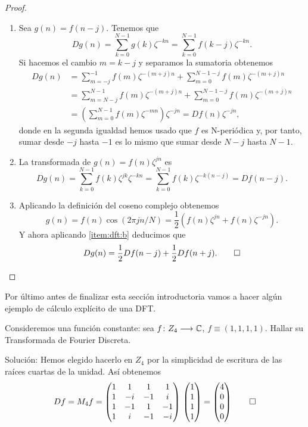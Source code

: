 \documentclass{article}
\begin{document}
\begin{proof}~
\begin{enumerate}
    \item Sea $g(n)=f(n-j)$. Tenemos que
    \[
    Dg(n)=\sum_{k=0}^{N-1}g(k)\zeta^{-kn}=\sum_{k=0}^{N-1}f(k-j)\zeta^{-kn}.
    \]
    Si hacemos el cambio $m=k-j$ y separamos la sumatoria obtenemos
    \begin{align*}
    Dg(n) & =\sum_{m=-j}^{-1}f(m)\zeta^{-(m+j)n}+\sum_{m=0}^{N-1-j}f(m)\zeta^{-(m+j)n} \\
    & =\sum_{m=N-j}^{N-1}f(m)\zeta^{-(m+j)n}+\sum_{m=0}^{N-1-j}f(m)\zeta^{-(m+j)n} \\
    & =\left(\sum_{m=0}^{N-1}f(m)\zeta^{-mn}\right)\zeta^{-jn} =Df(n)\zeta^{-jn},
    \end{align*}
    donde en la segunda igualdad hemos usado que $f$ es N-periódica y, por tanto, sumar desde $-j$ hasta $-1$ es lo mismo que sumar desde $N-j$ hasta $N-1$.
    \item La transformada de $g(n) = f(n)\zeta^{jn}$ es 
    \[
    Dg(n) = \sum_{k=0}^{N-1}f(k)\zeta^{jk}\zeta^{-kn}=\sum_{k=0}^{N-1}f(k)\zeta^{-k(n-j)}=Df(n-j).
    \]
    \item Aplicando la definición del coseno complejo obtenemos
    \[
    g(n) = f(n)\cos(2\pi jn/N)=\frac{1}{2}\left(f(n)\zeta^{jn}+f(n)\zeta^{-jn}\right).
    \]
    Y ahora aplicando \ref{item:dft:b} deducimos que 
    \[
    Dg(n) = \frac{1}{2}Df(n-j)+\frac{1}{2}Df(n+j). \qedhere
    \]
\end{enumerate}
\end{proof}

Por último antes de finalizar esta sección introductoria vamos a hacer algún ejemplo de cálculo explícito de una DFT.

\begin{ex}
Consideremos una función constante: sea $f\colon Z_4 \longrightarrow \mathbb{C}$, $f\equiv(1,1,1,1)$. Hallar su Transformada de Fourier Discreta.

Solución:
Hemos elegido hacerlo en $Z_4$ por la simplicidad de escritura de las raíces cuartas de la unidad. Así obtenemos
\[
Df=M_{4}f=\begin{pmatrix}
1&1&1&1 \\
1&-i&-1&i\\
1&-1&1&-1\\
1&i&-1&-i\\
\end{pmatrix}
\,
\begin{pmatrix}
1\\1\\1\\1\\
\end{pmatrix}=
\begin{pmatrix}
4\\0\\0\\0\\
\end{pmatrix} \qedhere
\]
\end{ex}
\end{document}
